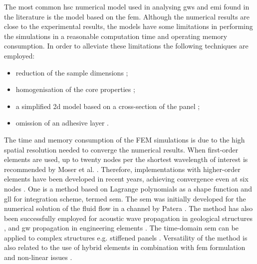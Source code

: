 The most common \ac{hsc} numerical model used in analysing \acp{gw} and \ac{emi} found in the literature is the model based on the \ac{fem}.
Although the numerical results are close to the experimental results, the models have some limitations in performing the simulations in a reasonable computation time and operating memory consumption.
In order to alleviate these limitations the following techniques are employed:
\begin{itemize}
\item reduction of the sample dimensions \cite{hosseini2013numerical, tian2015wavenumber};
\item homogenisation of the core properties \cite{catapano2014multi, zhou2020debonding};
\item a simplified \ac{2d} model based on a cross-section of the panel \cite{li2019detection};
\item omission of an adhesive layer \cite{mustapha2013non}.
\end{itemize}
The time and memory consumption of the FEM simulations is due to the high spatial resolution needed to converge the numerical results.
When first-order elements are used, up to twenty nodes per the shortest wavelength of interest is recommended by Moser et al. \cite{moser1999modeling}.
Therefore, implementations with higher-order elements have been developed in recent years, achieving convergence even at six nodes \cite{willberg2012comparison}.
One is a method based on Lagrange polynomials as a shape function and \ac{gll} for integration scheme, termed \ac{sem}.
The \ac{sem} was initially developed for the numerical solution of the fluid flow in a channel by Patera \cite{patera1984spectral}.
The method has also been successfully employed for acoustic wave propagation in geological structures \cite{seriani1994spectral, komatitsch2000simulation},  and \ac{gw} propagation in engineering elements \cite{kudela2007wave, ostachowicz2011guided, rucka2010experimental,rekatsinas2017cubic}.
The time-domain \ac{sem} can be applied to complex structures e.g. stiffened panels \cite{schulte2011simulation, lonkar2014modeling}.
Versatility of the method is also related to the use of hybrid elements in combination with \ac{fem} formulation \cite{ha2009optimizing} and non-linear issues \cite{yu2020time, li2021hybrid}.

